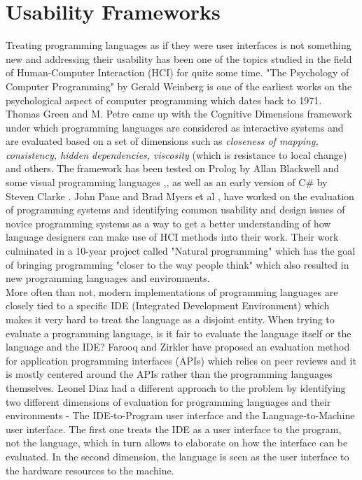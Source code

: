 \section{Usability Frameworks}
Treating programming languages as if they were user interfaces is not something new and addressing their usability has been one of the topics studied in the field of Human-Computer Interaction (HCI) for quite some time. "The Psychology of Computer Programming" by Gerald Weinberg \cite{GWeinberg} is one of the earliest works on the psychological aspect of computer programming which dates back to 1971. Thomas Green and M. Petre \cite{CognitiveDimensions} came up with the Cognitive Dimensions framework under which programming languages are considered as interactive systems and are evaluated based on a set of dimensions such as \textit{closeness of mapping, consistency, hidden dependencies, viscosity} (which is resistance to local change) and others. The framework has been tested on Prolog by Allan Blackwell \cite{CognitiveDimensions2} and some visual programming languages \cite{InstructsDescripts},\cite{InformationArtefacts},\cite{CognitiveDimensions} as well as an early version of C\# by Steven Clarke \cite{NewLangEval}. John Pane and Brad Myers et al \cite{NaturalProgramming}, have worked on the evaluation of programming systems and identifying common usability and design issues of novice programming systems as a way to get a better understanding of how language designers can make use of HCI methods into their work. Their work culminated in a 10-year project called "Natural programming" which has the goal of bringing programming "closer to the way people think" which also resulted in new programming languages and environments. 
\\More often than not, modern implementations of programming languages are closely tied to a specific IDE (Integrated Development Environment) which makes it very hard to treat the language as a disjoint entity. When trying to evaluate a programming language, is it fair to evaluate the language itself or the language and the IDE? Farooq and Zirkler \cite{APPPeer} have proposed an evaluation method for application programming interfaces (APIs) which relies on peer reviews and it is mostly centered around the APIs rather than the programming languages themselves. Leonel Diaz \cite{LangsasUI} had a different approach to the problem by identifying two different dimensions of evaluation for programming languages and their environments -  The IDE-to-Program user interface and the Language-to-Machine user interface. The first one treats the IDE as a user interface to the program, not the language, which in turn allows to elaborate on how the interface can be evaluated. In the second dimension, the language is seen as the user interface to the hardware resources to the machine.		


